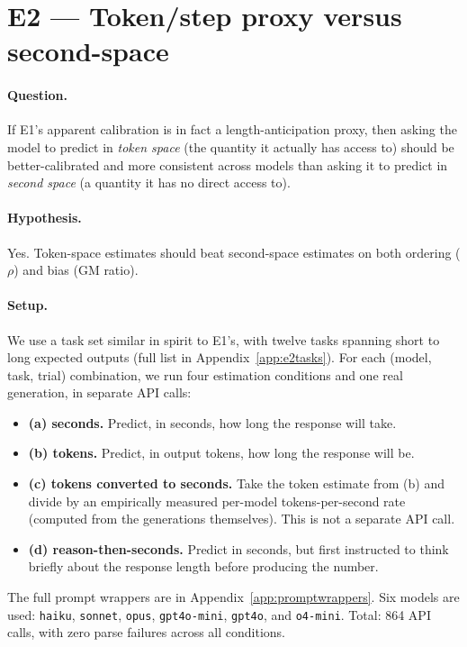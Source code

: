 \documentclass[11pt]{article}
\newcommand{\code}[1]{\texttt{\small #1}}
\begin{document}
\section{E2 --- Token/step proxy versus second-space}
\label{sec:e2}

\paragraph{Question.} If E1's apparent calibration is in fact a length-anticipation proxy,
then asking the model to predict in \emph{token space} (the quantity it actually has access
to) should be better-calibrated and more consistent across models than asking it to predict in
\emph{second space} (a quantity it has no direct access to).

\paragraph{Hypothesis.} Yes. Token-space estimates should beat second-space estimates on both
ordering ($\rho$) and bias (GM ratio).

\paragraph{Setup.} We use a task set similar in spirit to E1's, with twelve tasks spanning
short to long expected outputs (full list in Appendix~\ref{app:e2tasks}). For each (model,
task, trial) combination, we run four estimation conditions and one real generation, in
separate API calls:

\begin{itemize}
\item \textbf{(a) seconds.} Predict, in seconds, how long the response will take.
\item \textbf{(b) tokens.} Predict, in output tokens, how long the response will be.
\item \textbf{(c) tokens converted to seconds.} Take the token estimate from (b) and divide by
an empirically measured per-model tokens-per-second rate (computed from the generations
themselves). This is not a separate API call.
\item \textbf{(d) reason-then-seconds.} Predict in seconds, but first instructed to think
briefly about the response length before producing the number.
\end{itemize}

The full prompt wrappers are in Appendix~\ref{app:promptwrappers}. Six models are used:
\code{haiku}, \code{sonnet}, \code{opus}, \code{gpt4o-mini}, \code{gpt4o}, and \code{o4-mini}.
Total: 864 API calls, with zero parse failures across all conditions.
\end{document}
